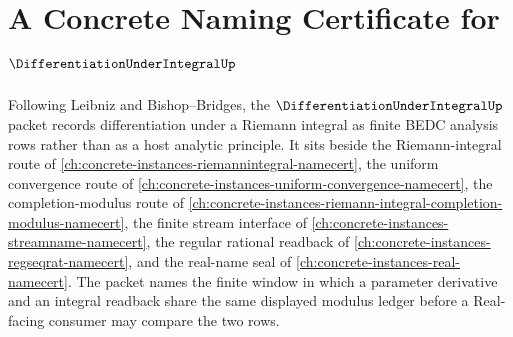 \chapter{A Concrete Naming Certificate for $\DifferentiationUnderIntegralUp$}
\label{ch:concrete-instances-differentiation-under-integral-namecert}

Following Leibniz and Bishop--Bridges, the $\DifferentiationUnderIntegralUp$ packet records differentiation under a Riemann integral as finite BEDC analysis rows rather than as a host analytic principle. It sits beside the Riemann-integral route of \autoref{ch:concrete-instances-riemannintegral-namecert}, the uniform convergence route of \autoref{ch:concrete-instances-uniform-convergence-namecert}, the completion-modulus route of \autoref{ch:concrete-instances-riemann-integral-completion-modulus-namecert}, the finite stream interface of \autoref{ch:concrete-instances-streamname-namecert}, the regular rational readback of \autoref{ch:concrete-instances-regseqrat-namecert}, and the real-name seal of \autoref{ch:concrete-instances-real-namecert}. The packet names the finite window in which a parameter derivative and an integral readback share the same displayed modulus ledger before a Real-facing consumer may compare the two rows.

